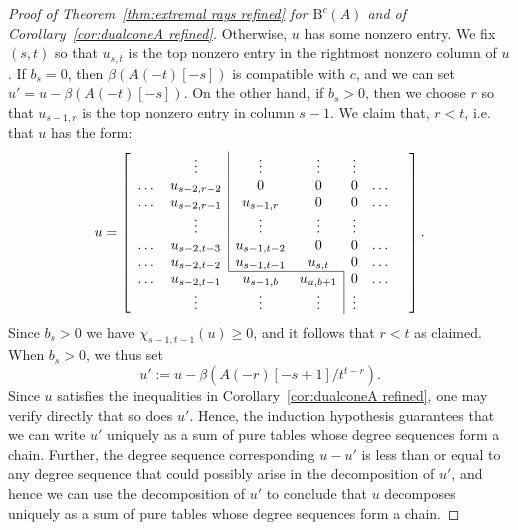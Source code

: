 \documentclass[12pt]{amsart}
\theoremstyle{definition}
\theoremstyle{remark}
\newcommand{\bb}{c}
\newcommand{\BBQ}{\mathrm{B}}
\begin{document}
\begin{proof}[Proof of Theorem~\ref{thm:extremal rays refined} for $\BBQ^{\bb}(A)$ and of Corollary~\ref{cor:dualconeA refined}]
Otherwise, $u$ has some nonzero entry.  We fix $(s,t)$ so that $u_{s,t}$ is the top nonzero entry in the rightmost nonzero column of $u$.
If $b_s=0$, then $\beta(A(-t)[-s])$ is compatible with $\bb$, and we can set $u'=u-\beta(A(-t)[-s])$.  On the other hand, if $b_s>0$, then we choose $r$ so that $u_{s-1,r}$ is the top nonzero entry in column $s-1$.  We claim that, $r<t$, i.e. that $u$ has the form:
\[
u=
\left[
\begin{array}{ccccccc}
 & \vdots& \multicolumn{1}{|c}{\vdots}&\vdots& \vdots&&\\
\dots&u_{s-2,r-2}&\multicolumn{1}{|c}{0}&0&0&\dots\\
\dots&u_{s-2,r-1}&\multicolumn{1}{|c}{u_{s-1,r}}&0&0&\dots\\
 & \vdots& \multicolumn{1}{|c}{\vdots}&\vdots& \vdots&&\\
\dots&u_{s-2,t-3}&\multicolumn{1}{|c}{u_{s-1,t-2}}&0&0&\dots\\
\dots&u_{s-2,t-2}&\multicolumn{1}{|c}{u_{s-1,t-1}}&u_{s,t}&0&\dots\\ \cline{3-4}
\dots&u_{s-2,t-1}&u_{s-1,b}&u_{a,b+1}&\multicolumn{1}{|c}{0}&\dots\\
& \vdots&\vdots&\vdots& \multicolumn{1}{|c}{\vdots}&&\\
\end{array}\right].
\]
Since $b_s>0$ we have $\chi_{s-1,t-1}(u)\geq 0$, and it follows that $r<t$ as claimed.  When $b_s>0$, we thus set
\[
u':=u-\beta(A(-r)[-s+1]/t^{t-r}).
\]
Since $u$ satisfies the inequalities in Corollary~\ref{cor:dualconeA refined}, one may verify directly that so does $u'$.  Hence, the induction hypothesis guarantees that we can write $u'$ uniquely as a sum of pure tables whose degree sequences form a chain.  Further, the degree sequence corresponding $u-u'$ is less than or equal to any degree sequence that could possibly arise in the decomposition of $u'$, and hence we can use the decomposition of $u'$ to conclude that $u$ decomposes uniquely as a sum of pure tables whose degree sequences form a chain.


\end{proof}
\end{document}
